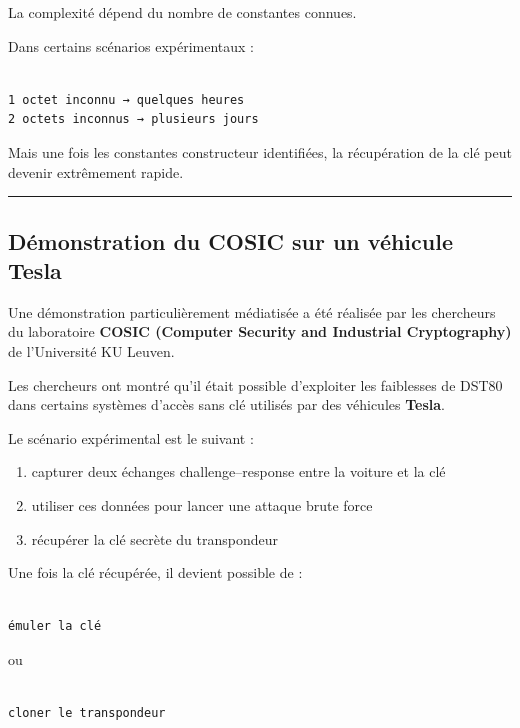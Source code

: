 \documentclass[
  french,
]{article}
\providecommand{\tightlist}{%
  \setlength{\itemsep}{0pt}\setlength{\parskip}{0pt}}
\begin{document}
La complexité dépend du nombre de constantes connues.

Dans certains scénarios expérimentaux :

\begin{verbatim}

1 octet inconnu → quelques heures
2 octets inconnus → plusieurs jours
\end{verbatim}

Mais une fois les constantes constructeur identifiées, la récupération
de la clé peut devenir extrêmement rapide.

\begin{center}\rule{0.5\linewidth}{0.5pt}\end{center}

\subsection{Démonstration du COSIC sur un véhicule
Tesla}\label{duxe9monstration-du-cosic-sur-un-vuxe9hicule-tesla}

Une démonstration particulièrement médiatisée a été réalisée par les
chercheurs du laboratoire \textbf{COSIC (Computer Security and
Industrial Cryptography)} de l'Université KU Leuven.

Les chercheurs ont montré qu'il était possible d'exploiter les
faiblesses de DST80 dans certains systèmes d'accès sans clé utilisés par
des véhicules \textbf{Tesla}.

Le scénario expérimental est le suivant :

\begin{enumerate}
\def\labelenumi{\arabic{enumi}.}
\tightlist
\item
  capturer deux échanges challenge--response entre la voiture et la clé
\item
  utiliser ces données pour lancer une attaque brute force
\item
  récupérer la clé secrète du transpondeur
\end{enumerate}

Une fois la clé récupérée, il devient possible de :

\begin{verbatim}

émuler la clé
\end{verbatim}

ou

\begin{verbatim}

cloner le transpondeur
\end{verbatim}
\end{document}
